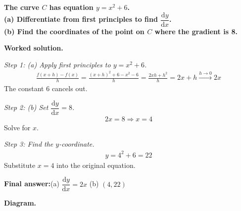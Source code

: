 \documentclass[11pt]{article}
\newcommand{\question}[1]{\par\medskip\noindent\textbf{#1}\par}
\begin{document}
\question{The curve \( C \) has equation \( y = x^2 + 6 \).\\[3pt]  (a) Differentiate from first principles to find \( \dfrac{\mathrm{d}y}{\mathrm{d}x} \).\\[3pt]  (b) Find the coordinates of the point on \( C \) where the gradient is 8.}

\textbf{Worked solution.}

\textit{Step 1: (a) Apply first principles to \( y = x^2 + 6 \).}
\[\begin{gathered}
\frac{f(x+h)-f(x)}{h} = \frac{(x+h)^2 + 6 - x^2 - 6}{h} = \frac{2xh + h^2}{h} = 2x + h \xrightarrow{h\to 0} 2x
\end{gathered}\]
The constant 6 cancels out.

\textit{Step 2: (b) Set \( \dfrac{\mathrm{d}y}{\mathrm{d}x} = 8 \).}
\[\begin{gathered}
2x = 8 \Rightarrow x = 4
\end{gathered}\]
Solve for \( x \).

\textit{Step 3: Find the \( y \)-coordinate.}
\[\begin{gathered}
y = 4^2 + 6 = 22
\end{gathered}\]
Substitute \( x = 4 \) into the original equation.

\begin{answerbox}
\textbf{Final answer:}\quad (a) \(\displaystyle  \dfrac{\mathrm{d}y}{\mathrm{d}x} = 2x \) \quad  (b) \(\displaystyle  (4, 22) \)
\end{answerbox}
\textbf{Diagram.}
\end{document}
